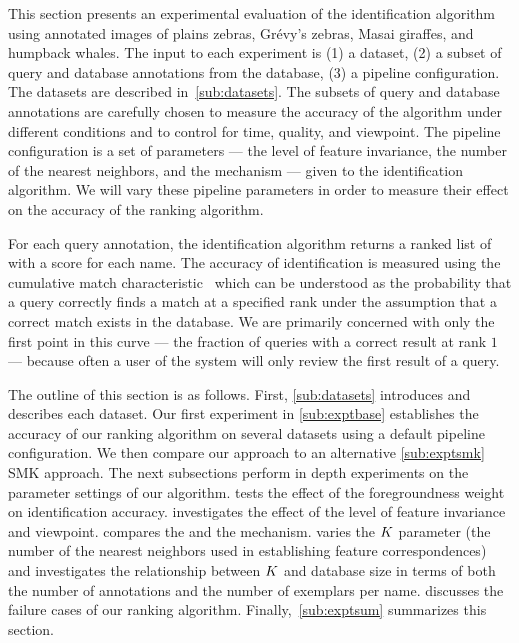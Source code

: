     This section presents an experimental evaluation of the identification algorithm using annotated images of
      plains zebras, Grévy's zebras, Masai giraffes, and humpback whales.
    The input to each experiment is
    (1) a dataset,
    (2) a subset of query and database annotations from the database,
    (3) a pipeline configuration.
    The datasets are described in~\cref{sub:datasets}.
    The subsets of query and database annotations are carefully chosen to measure the accuracy of the algorithm
      under different conditions and to control for time, quality, and viewpoint.
    The pipeline configuration is a set of parameters --- \eg{} the level of feature invariance, the number of
      the nearest neighbors, and the \namescoring{} mechanism --- given to the identification algorithm.
    We will vary these pipeline parameters in order to measure their effect on the accuracy of the ranking
      algorithm.

    For each query annotation, the identification algorithm returns a ranked list of \names{} with a score for each
    name. The accuracy of identification is measured using the cumulative match
    characteristic~\cite{decann_relating_2013} which can be understood as the probability that a query correctly
    finds a match at a specified rank under the assumption that a correct match exists in the database. We are
    primarily concerned with only the first point in this curve --- the fraction of queries with a correct result at
    rank $1$ --- because often a user of the system will only review the first result of a query.

    The outline of this section is as follows. First, \cref{sub:datasets} introduces and describes each dataset.
    Our first experiment in \cref{sub:exptbase} establishes the accuracy of our ranking algorithm on several
    datasets using a default pipeline configuration. We then compare our approach to an alternative
    \cref{sub:exptsmk} SMK approach. The next subsections perform in depth experiments on the parameter settings of
    our algorithm.  tests the effect of the foregroundness weight on identification accuracy.
     investigates the effect of the level of feature invariance and viewpoint.
     compares the \csumprefix{} and the \nsumprefix{} \namescoring{} mechanism.
     varies the $K$ parameter (the number of the nearest neighbors used in establishing feature
    correspondences) and investigates the relationship between $K$ and database size in terms of both the number
    of annotations and the number of exemplars per name.  discusses the failure cases of our
    ranking algorithm. Finally,~\cref{sub:exptsum} summarizes this section.


